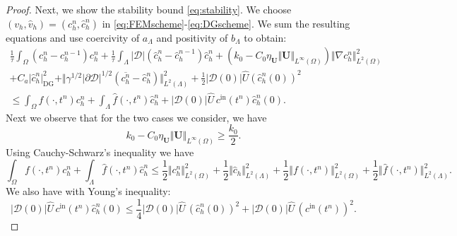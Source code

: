 \documentclass[10pt,a4paper]{amsart}
\newcommand{\DG}{\mathrm{DG}}
\newcommand{\bfU}{{\boldsymbol U}}
\begin{document}
\begin{proof}
Next, we show the stability bound \eqref{eq:stability}. We choose $(v_h,\hat v_h) = (c_h^n, \hat c_h^n)$ in \eqref{eq:FEMscheme}-\eqref{eq:DGscheme}. We sum the resulting equations and use coercivity of $a_\Lambda$ and positivity of $b_\Lambda$ to obtain:
\begin{align}
    \frac{1}{\tau}\int_\Omega (c_h^{n}-c_h^{n-1}) c_h^n
      + \frac{1}{\tau} \int_\Lambda |\mathcal{D}|(\hat c_h^{n}- \hat c_h^{n-1}) \hat c_h^n 
      +  (k_0 - C_0\eta_\bfU \Vert \bfU\Vert_{L^\infty(\Omega)}) \Vert \nabla c_h^n \Vert_{L^2(\Omega)}^2
      \nonumber\\
      + C_a \vert \hat c_h^n \vert_{\DG}^2 
      +\Vert \gamma^{1/2} \vert \partial\mathcal{D}\vert^{1/2} \left(\overline{c_h^{n}}-\hat{c}_h^{n}\right)\Vert_{L^2(\Lambda)}^2
%
+ \frac12 \vert \mathcal{D}(0)\vert \hat U (\hat c_h^n(0))^2
%   
\nonumber\\
        \leq  \int_\Omega f(\cdot,t^{n}) c_h^n
   + \int_\Lambda \hat f(\cdot, t^{n}) \hat c_h^n
   + |\mathcal{D}(0)|\hat U \, c^{\mathrm{in}}(t^n) \hat c_h^n(0).\label{eq:apriori1}
\end{align}
Next we observe that for the two cases we consider, we have
\begin{equation}\label{eq:twocases}
k_0 - C_0\eta_\bfU \Vert \bfU\Vert_{L^\infty(\Omega)} \geq \frac{k_0}{2}.
\end{equation}
Using Cauchy-Schwarz's inequality we have
\[
\int_\Omega f(\cdot,t^{n}) c_h^n
   + \int_\Lambda \hat f(\cdot, t^{n}) \hat c_h^n
   \leq \frac12 \Vert c_h^n\Vert_{L^2(\Omega)}^2
   + \frac12 \Vert \hat c_h \Vert_{L^2(\Lambda)}^2
   +\frac12 \Vert f(\cdot,t^n)\Vert_{L^2(\Omega)}^2
   + \frac12 \Vert \hat f(\cdot,t^n) \Vert_{L^2(\Lambda)}^2.
\]
We also have with Young's inequality:
\[
|\mathcal{D}(0)|\hat U \, c^{\mathrm{in}}(t^n)  \hat c_h^n(0)
\leq\frac14 |\mathcal{D}(0)|\hat U \,  (\hat c_h^n(0))^2
+ |\mathcal{D}(0)|\hat U \, (c^{\mathrm{in}}(t^n))^2.
\]


\end{proof}
\end{document}
